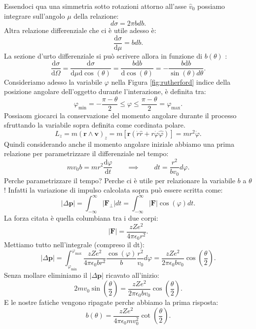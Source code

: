 Essendoci qua una simmetria sotto rotazioni attorno all'asse $\hat{v}_0$ possiamo integrare sull'angolo $\mu$ della relazione:
\[
d\sigma = 2 \pi b db
.\] 
Altra relazione differenziale che ci è utile adesso è: 
\[
\frac{\mbox{d} \sigma}{\mbox{d} \mu} = b db
.\] 
La sezione d'urto differenziale si può scrivere allora in funzione di $b\left( \theta \right)$ :
\[
	\frac{\mbox{d} \sigma}{\mbox{d} \Omega} = \frac{\mbox{d} \sigma}{\mbox{d}\mu \mbox{d}\cos\left( \theta \right) } = \frac{ b \mbox{d}b}{\mbox{d}\cos\left( \theta \right)} = - \frac{b \text{d}b}{ \sin\left( \theta \right) d \theta }  
.\]
Consideriamo adesso la variabile $\varphi$ nella Figura \ref{fig:rutherford} indice della posizione angolare dell'oggetto durante l'interazione, è definita  tra:
\[
\varphi_{\text{min}} = -\frac{\pi - \theta}{2} \le \varphi \le \frac{\pi -\theta}{2} = \varphi_{\text{max}}
.\] 
Possiaom giocarci la conservazione del momento angolare durante il processo sfruttando la variabile sopra definita come cordinata polare.
\[
	L_z = m \left( \boldsymbol{r \wedge \boldsymbol{v}}\right)_z = m \left[ \boldsymbol{r} \left( \dot{r} \hat{r} + r \dot{\varphi} \hat{\varphi}\right)\right]=
	mr^2\dot{\varphi}
.\] 
Quindi considerando anche il momento angolare iniziale abbiamo una prima relazione per parametrizzare il differenziale nel tempo:
\[
m v_0 b = m r^2 \frac{\mbox{d} \varphi}{\mbox{d} t} \quad \quad \implies \quad \quad dt = \frac{r^2}{b v_0} d\varphi
.\] 
Perche parametrizzare il tempo? Perche ci è utile per relazionare la variabile $b$ a $\theta$! Infatti la variazione di impulso calcolata sopra può essere scritta come:
\[
\left| \Delta \boldsymbol{p} \right| = \int_{-\infty}^{\infty} \left| \boldsymbol{F}_{\perp}\right| dt = 
\int_{-\infty}^{\infty} \left| \boldsymbol{F}\right| \cos\left( \varphi \right)  dt 
.\]
La forza citata è quella columbiana tra i due corpi:
\[
\left|\boldsymbol{F}\right| = \frac{zZe^2}{4 \pi \epsilon_0 r^2} 
.\] 
Mettiamo tutto nell'integrale (compreso il dt):
\[
	\left| \Delta \boldsymbol{p} \right| = \int_{\varphi_{\text{min}}}^{\varphi_{\text{max}}} \frac{zZe^2}{4 \pi \epsilon_0 b r^2} \frac{\cos\left( \varphi \right) }{b} \frac{r^2}{v_0} d \varphi 
	=  \frac{zZe^2}{2 \pi \epsilon_0 b v_0} \cos\left( \frac{\theta}{2} \right) 
.\] 
Senza mollare eliminiamo il $\left| \Delta \boldsymbol{p} \right|$ ricavato all'inizio:
\[
	2mv_0 \sin\left( \frac{\theta}{2} \right) = \frac{zZe^2}{2 \pi \epsilon_0 b v_0} \cos\left( \frac{\theta}{2} \right) 
.\] 
E le nostre fatiche vengono ripagate perche abbiamo la prima risposta:
\[
	b\left( \theta \right) = \frac{zZe^2}{4 \pi \epsilon_0 m  v_0^2} \cot\left( \frac{\theta}{2} \right) 
.\] 

